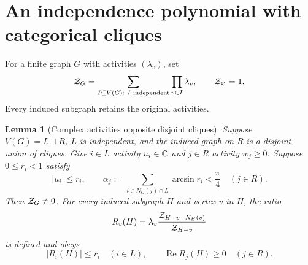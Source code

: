 \documentclass[11pt]{article}
\numberwithin{equation}{section}
\newtheorem{lemma}[theorem]{Lemma}
\theoremstyle{remark}\newtheorem{remark}[theorem]{Remark}
\begin{document}
\section{An independence polynomial with categorical cliques}
\label{sec:cliques}
For a finite graph $G$ with activities $(\lambda_v)$, set
\[
 \mathcal Z_G=\sum_{I\subseteq V(G):\ I\text{ independent}}
                  \prod_{v\in I}\lambda_v,
 \qquad \mathcal Z_\varnothing=1.
\]
Every induced subgraph retains the original activities.

\begin{lemma}[Complex activities opposite disjoint cliques]\label{lem:cliques}
Suppose $V(G)=L\sqcup R$, $L$ is independent, and the induced graph on $R$
is a disjoint union of cliques. Give $i\in L$ activity $u_i\in\mathbb C$ and
$j\in R$ activity $w_j\ge0$. Suppose $0\le r_i<1$ satisfy
\begin{equation}\label{eq:arcsin}
 |u_i|\le r_i,\qquad
 \alpha_j:=\sum_{i\in N_G(j)\cap L}\arcsin r_i<\frac\pi4
 \quad(j\in R).
\end{equation}
Then $\mathcal Z_G\ne0$. For every induced subgraph $H$ and vertex $v$ in $H$,
the ratio
\[
 R_v(H)=\lambda_v\frac{\mathcal Z_{H-v-N_H(v)}}{\mathcal Z_{H-v}}
\]
is defined and obeys
\begin{equation}\label{eq:ratios}
 |R_i(H)|\le r_i\quad(i\in L),\qquad
 \operatorname{Re}R_j(H)\ge0\quad(j\in R).
\end{equation}
\end{lemma}
\end{document}
